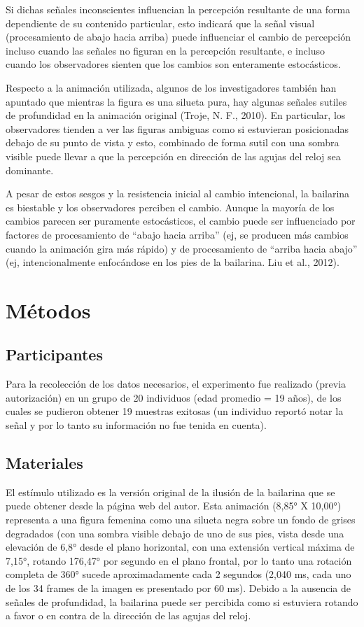 \documentclass[jou]{apa6}
\begin{document}
Si dichas señales inconscientes influencian la percepción resultante de una forma
dependiente de su contenido particular, esto indicará que la señal visual (procesamiento de
abajo hacia arriba) puede influenciar el cambio de percepción incluso cuando las señales no
figuran en la percepción resultante, e incluso
cuando los observadores sienten que los cambios son enteramente estocásticos.

Respecto a la animación utilizada, algunos de los investigadores también han apuntado
que mientras la figura es una silueta pura, hay algunas señales sutiles de profundidad en la
animación original (Troje, N. F., 2010). En particular, los observadores tienden a ver las
figuras ambiguas como si estuvieran posicionadas debajo de su punto de vista y esto,
combinado de forma sutil con una sombra visible puede llevar a que la percepción en
dirección de las agujas del reloj sea dominante.

A pesar de estos sesgos y la resistencia inicial al cambio intencional, la bailarina es
biestable y los observadores perciben el cambio. Aunque la
mayoría de los cambios parecen ser puramente estocásticos, el cambio puede ser influenciado
por factores de procesamiento de “abajo hacia arriba” (ej, se producen más cambios cuando
la animación gira más rápido) y de procesamiento de “arriba hacia abajo” (ej,
intencionalmente enfocándose en los pies de la bailarina. Liu et al., 2012).

\section{Métodos}
\subsection{Participantes}
Para la recolección de los datos necesarios, el experimento fue realizado (previa
autorización) en un grupo de 20 individuos (edad promedio = 19 años), de los cuales se
pudieron obtener 19 muestras exitosas (un individuo reportó notar la señal y por lo tanto su
información no fue tenida en cuenta).

\subsection{Materiales}
El estímulo utilizado es la versión original de la ilusión de la bailarina que se puede
obtener desde la página web del autor. Esta animación (\ang{8,85} X \ang{10,00}) representa a una
figura femenina como una silueta negra sobre un fondo de grises degradados (con una sombra
visible debajo de uno de sus pies, vista desde una elevación de \ang{6,8} desde el plano horizontal,
con una extensión vertical máxima de \ang{7,15}, rotando \ang{176,47} por segundo en el plano frontal,
por lo tanto una rotación completa de \ang{360} sucede aproximadamente cada 2 segundos (2,040
ms, cada uno de los 34 frames de la imagen es presentado por 60 ms). Debido a la ausencia
de señales de profundidad, la bailarina puede ser percibida como si estuviera rotando a favor
o en contra de la dirección de las agujas del reloj.
\end{document}
